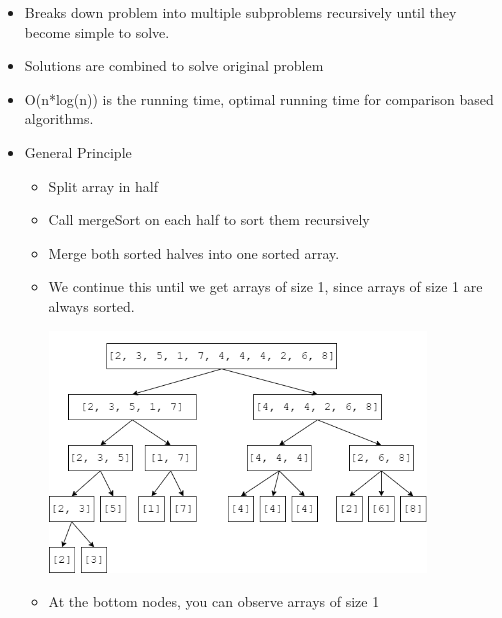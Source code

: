 \documentclass[11pt]{article}
\begin{document}
\begin{enumerate}
\begin{itemize}
\begin{itemize}
                \item Breaks down problem into multiple subproblems recursively until they become simple to solve.
                \item Solutions are combined to solve original problem
                \item O(n*log(n)) is the running time, optimal running time for comparison based algorithms.
                \item General Principle
                \begin{itemize}
                    \item Split array in half
                    \item Call mergeSort on each half to sort them recursively
                    \item Merge both sorted halves into one sorted array. 
                    \item We continue this until we get arrays of size 1, since arrays of size 1 are always sorted.
                    
                    \includegraphics[width=10cm]{07-MergeSort2.drawio.png}

                    \item At the bottom nodes, you can observe arrays of size 1
                \end{itemize}
            \end{itemize}
        \end{itemize}
    \end{enumerate}
\end{document}
